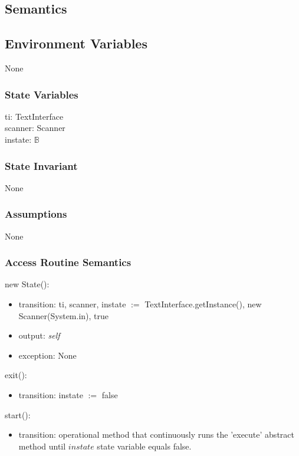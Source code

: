 \documentclass[12pt]{article}
\begin{document}
\subsection* {Semantics}

\subsection*{Environment Variables}

None

\subsubsection* {State Variables}

ti: TextInterface\\
scanner: Scanner\\
instate: $\mathbb{B}$\\

\subsubsection* {State Invariant}

None

\subsubsection* {Assumptions}

None

\subsubsection* {Access Routine Semantics}

\noindent new State():
\begin{itemize}
  \item transition: ti, scanner, instate $:=$ TextInterface.getInstance(), new Scanner(System.in), true
  \item output: \textit{self}
  \item exception: None
\end{itemize}

\noindent exit():
\begin{itemize}
\item transition: instate $:=$ false
\end{itemize}

\noindent start():
\begin{itemize}
\item transition: operational method that continuously runs the 'execute' abstract method until $instate$ state variable equals false.
\end{itemize}
\end{document}
